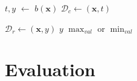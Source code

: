 \documentclass[runningheads,a4paper]{llncs}
\begin{document}



\begin{algorithm}
\footnotesize

\caption{$f(\mathbf{x})$}\label{ourf}
\begin{algorithmic}[1]
\State $t,y$ $\gets$ $b(\mathbf{x})$
\State$\mathcal{D}_{c} \gets (\mathbf{x},t)$  

	\State$\mathcal{D}_{r} \gets (\mathbf{x},y)$ 
 \EndIf
	\State \Return $y$ 
  \Else
	\State \Return $\max_{val}$ or $\min_{val}$
 \EndIf 
\end{algorithmic}
\end{algorithm}



\section{Evaluation}
\label{evaluation}



\end{document}
